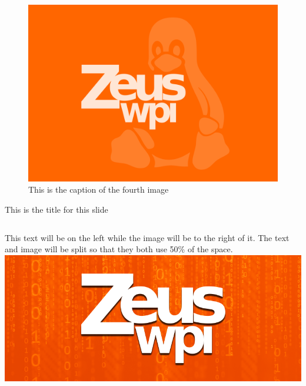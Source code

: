 \documentclass{beamer}
\begin{document}
\begin{frame}[plain, c]
    \begin{figure}
        \includegraphics[width=\linewidth]{image4.png}
        \caption{This is the caption of the fourth image}
    \end{figure}
\end{frame}
\begin{frame}[plain, c]{This is the title for this slide}
    \begin{columns}[c]
        This text will be on the left while the image will be to the right of it.
        The text and image will be split so that they both use 50\% of the space.
        \includegraphics[width=\linewidth]{image5.png}
    \end{columns}
\end{frame}
\end{document}
